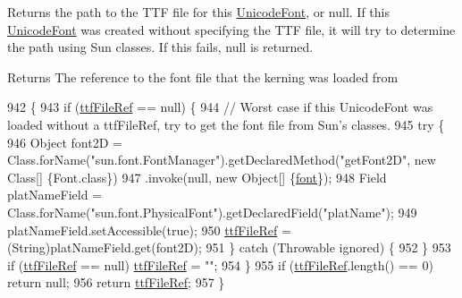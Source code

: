 Returns the path to the T\+TF file for this \mbox{\hyperlink{classorg_1_1newdawn_1_1slick_1_1_unicode_font}{Unicode\+Font}}, or null. If this \mbox{\hyperlink{classorg_1_1newdawn_1_1slick_1_1_unicode_font}{Unicode\+Font}} was created without specifying the T\+TF file, it will try to determine the path using Sun classes. If this fails, null is returned.

\begin{DoxyReturn}{Returns}
The reference to the font file that the kerning was loaded from 
\end{DoxyReturn}

\begin{DoxyCode}
942                                  \{
943         \textcolor{keywordflow}{if} (\mbox{\hyperlink{classorg_1_1newdawn_1_1slick_1_1_unicode_font_a2f13dde71bdabcab77c49030a4af17f2}{ttfFileRef}} == null) \{
944             \textcolor{comment}{// Worst case if this UnicodeFont was loaded without a ttfFileRef, try to get the font file
       from Sun's classes.}
945             \textcolor{keywordflow}{try} \{
946                 Object font2D = Class.forName(\textcolor{stringliteral}{"sun.font.FontManager"}).getDeclaredMethod(\textcolor{stringliteral}{"getFont2D"}, \textcolor{keyword}{new} 
      Class[] \{Font.class\})
947                     .invoke(null, \textcolor{keyword}{new} Object[] \{\mbox{\hyperlink{classorg_1_1newdawn_1_1slick_1_1_unicode_font_a956ab491839be375d47444a67ebff11c}{font}}\});
948                 Field platNameField = Class.forName(\textcolor{stringliteral}{"sun.font.PhysicalFont"}).getDeclaredField(\textcolor{stringliteral}{"platName"});
949                 platNameField.setAccessible(\textcolor{keyword}{true});
950                 \mbox{\hyperlink{classorg_1_1newdawn_1_1slick_1_1_unicode_font_a2f13dde71bdabcab77c49030a4af17f2}{ttfFileRef}} = (String)platNameField.get(font2D);
951             \} \textcolor{keywordflow}{catch} (Throwable ignored) \{
952             \}
953             \textcolor{keywordflow}{if} (\mbox{\hyperlink{classorg_1_1newdawn_1_1slick_1_1_unicode_font_a2f13dde71bdabcab77c49030a4af17f2}{ttfFileRef}} == null) \mbox{\hyperlink{classorg_1_1newdawn_1_1slick_1_1_unicode_font_a2f13dde71bdabcab77c49030a4af17f2}{ttfFileRef}} = \textcolor{stringliteral}{""};
954         \}
955         \textcolor{keywordflow}{if} (\mbox{\hyperlink{classorg_1_1newdawn_1_1slick_1_1_unicode_font_a2f13dde71bdabcab77c49030a4af17f2}{ttfFileRef}}.length() == 0) \textcolor{keywordflow}{return} null;
956         \textcolor{keywordflow}{return} \mbox{\hyperlink{classorg_1_1newdawn_1_1slick_1_1_unicode_font_a2f13dde71bdabcab77c49030a4af17f2}{ttfFileRef}};
957     \}
\end{DoxyCode}
\mbox{\label{classorg_1_1newdawn_1_1slick_1_1_unicode_font_a30b90c7e39d5561f93cae92300ed5a22}} 
